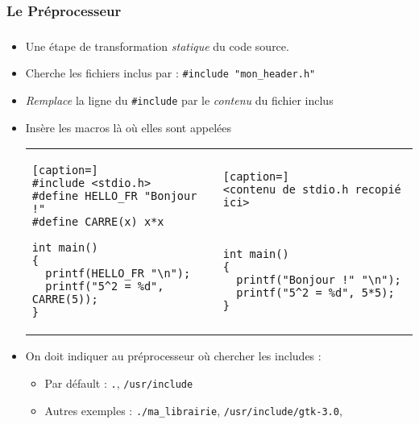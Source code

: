 \subsubsection{Le Préprocesseur}
\begin{frame}[fragile]
\frametitle{\insertsubsubsection}
\begin{itemize}
  \item Une étape de transformation \textit{statique} du code source.
  \item Cherche les fichiers inclus par : \texttt{\#include "mon\_header.h"}
  \item \textit{Remplace} la ligne du \texttt{\#include} par le \textit{contenu} du fichier inclus
  \item Insère les macros là où elles sont appelées
\begin{tabular}{p{5cm}p{5cm}}
\begin{lstlisting}[caption=]
#include <stdio.h>
#define HELLO_FR "Bonjour !"
#define CARRE(x) x*x

int main()
{
  printf(HELLO_FR "\n");
  printf("5^2 = %d", CARRE(5));
}
\end{lstlisting} & 
\begin{lstlisting}[caption=]
<contenu de stdio.h recopié ici>



int main()
{
  printf("Bonjour !" "\n");
  printf("5^2 = %d", 5*5);
}
\end{lstlisting}
\end{tabular}
\item On doit indiquer au préprocesseur où chercher les includes :
\begin{itemize}
    \item Par défault : \texttt{.}, \texttt{/usr/include}
    \item Autres exemples : \texttt{./ma\_librairie}, \texttt{/usr/include/gtk-3.0},\…
\end{itemize}
\end{itemize}
\end{frame}

